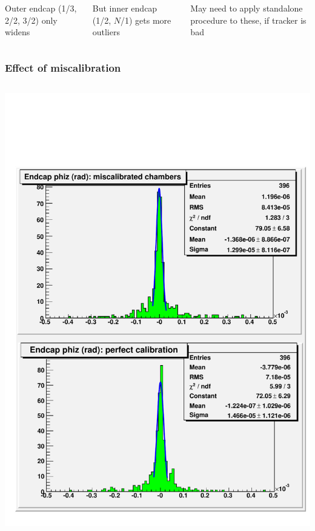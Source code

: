 \documentclass[compress]{beamer}
\begin{document}
\begin{frame}
\begin{columns}
\vspace{0.2 cm}
Outer endcap (1/3, 2/2, 3/2) only widens

\vspace{0.2 cm}
But inner endcap (1/2, $N$/1) gets more outliers

\vspace{0.2 cm}
May need to apply standalone procedure to these, if tracker is bad

\end{columns}
\end{frame}

\begin{frame}
\frametitle{Effect of miscalibration}
\begin{columns}
\includegraphics[width=\linewidth]{miscal_endcap_phiz.pdf}



\end{columns}
\end{frame}
\end{document}
